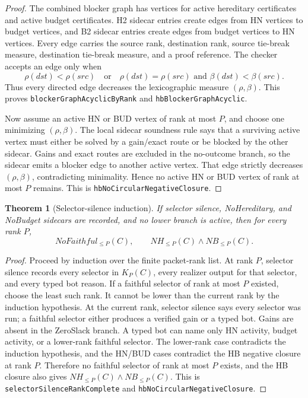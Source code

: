 \documentclass[10.5pt,a4paper]{article}
\newtheorem{theorem}{Theorem}[section]
\begin{document}
\begin{proof}
The combined blocker graph has vertices for active hereditary certificates and active budget certificates.  H2 sidecar entries create edges from HN vertices to budget vertices, and B2 sidecar entries create edges from budget vertices to HN vertices.  Every edge carries the source rank, destination rank, source tie-break measure, destination tie-break measure, and a proof reference.  The checker accepts an edge only when
\[
\rho(dst)<\rho(src)
\quad\text{or}\quad
\rho(dst)=\rho(src)\text{ and }\beta(dst)<\beta(src).
\]
Thus every directed edge decreases the lexicographic measure \((\rho,\beta)\).  This proves \texttt{blockerGraphAcyclicByRank} and \texttt{hbBlockerGraphAcyclic}.

Now assume an active HN or BUD vertex of rank at most \(P\), and choose one minimizing \((\rho,\beta)\).  The local sidecar soundness rule says that a surviving active vertex must either be solved by a gain/exact route or be blocked by the other sidecar.  Gains and exact routes are excluded in the no-outcome branch, so the sidecar emits a blocker edge to another active vertex.  That edge strictly decreases \((\rho,\beta)\), contradicting minimality.  Hence no active HN or BUD vertex of rank at most \(P\) remains.  This is \texttt{hbNoCircularNegativeClosure}.
\end{proof}

\begin{theorem}[Selector-silence induction]
If selector silence, NoHereditary, and NoBudget sidecars are recorded, and no lower branch is active, then for every rank \(P\),
\[
NoFaithful_{\le P}(C),
\qquad
NH_{\le P}(C)\wedge NB_{\le P}(C).
\]
\end{theorem}

\begin{proof}
Proceed by induction over the finite packet-rank list.  At rank \(P\), selector silence records every selector in \(K_P(C)\), every realizer output for that selector, and every typed bot reason.  If a faithful selector of rank at most \(P\) existed, choose the least such rank.  It cannot be lower than the current rank by the induction hypothesis.  At the current rank, selector silence says every selector was run; a faithful selector either produces a verified gain or a typed bot.  Gains are absent in the ZeroSlack branch.  A typed bot can name only HN activity, budget activity, or a lower-rank faithful selector.  The lower-rank case contradicts the induction hypothesis, and the HN/BUD cases contradict the HB negative closure at rank \(P\).  Therefore no faithful selector of rank at most \(P\) exists, and the HB closure also gives \(NH_{\le P}(C)\wedge NB_{\le P}(C)\).  This is \texttt{selectorSilenceRankComplete} and \texttt{hbNoCircularNegativeClosure}.
\end{proof}
\end{document}
